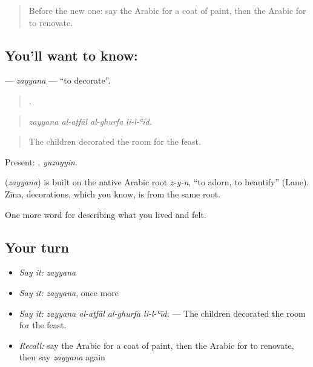 \label{lesson:AR-C552-zayyana}



\begin{quote}
Before the new one: say the Arabic for a coat of paint, then the Arabic for to renovate.
\end{quote}

\subsection*{You'll want to know: }
\textbf{} — \emph{zayyana} — \textquotedblleft{}to decorate\textquotedblright{}.

\begin{quote}
   .
\end{quote}

\begin{quote}
\emph{zayyana al-aṭfāl al-ghurfa li-l-ʿīd.}
\end{quote}

\begin{quote}
The children decorated the room for the feast.
\end{quote}

Present: , \emph{yuzayyin}.

\begin{cousinweb}
\textbf{} (\emph{zayyana}) is built on the native Arabic root \emph{z-y-n}, \textquotedblleft{}to adorn, to beautify\textquotedblright{} (Lane). Zīna, decorations, which you know, is from the same root.
\end{cousinweb}

\begin{grammarlens}[title={What you've built}]
One more word for describing what you lived and felt.
\end{grammarlens}

\subsection*{Your turn}
\begin{itemize}
\raggedright
  \item \emph{Say it:} \emph{zayyana}
  \item \emph{Say it:} \emph{zayyana}, once more
  \item \emph{Say it:} \emph{zayyana al-aṭfāl al-ghurfa li-l-ʿīd.} — The children decorated the room for the feast.
  \item \emph{Recall:} say the Arabic for a coat of paint, then the Arabic for to renovate, then say \emph{zayyana} again
\end{itemize}

